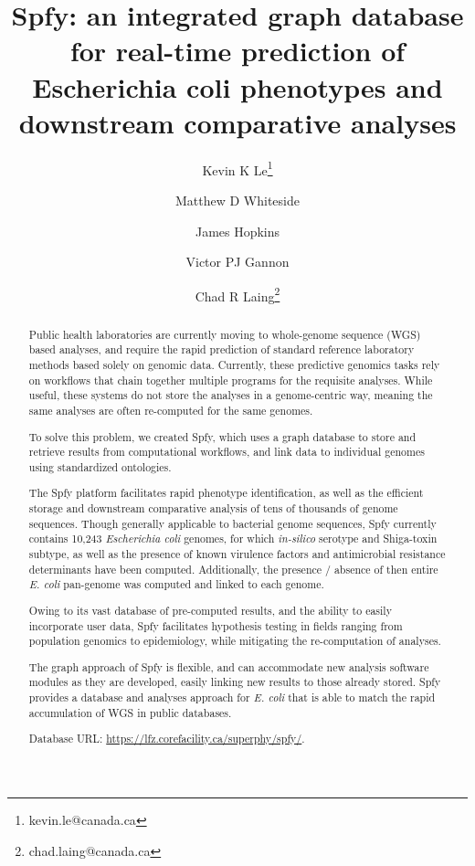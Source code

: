 \documentclass{article}
\begin{document}
\title{Spfy: an integrated graph database for real-time prediction of Escherichia coli phenotypes and downstream comparative analyses}

\author[1]{Kevin K Le\thanks{kevin.le@canada.ca}}
\author[1]{Matthew D Whiteside}
\author[1]{James Hopkins}
\author[1]{Victor PJ Gannon}
\author[1]{Chad R Laing\thanks{chad.laing@canada.ca}}

\renewcommand\Authands{ and }

\maketitle

\begin{abstract}

Public health laboratories are currently moving to whole-genome sequence (WGS) based analyses, and require the rapid prediction of standard reference laboratory methods based solely on genomic data. Currently, these predictive genomics tasks rely on workflows that chain together multiple programs for the requisite analyses. While useful, these systems do not store the analyses in a genome-centric way, meaning the same analyses are often re-computed for the same genomes.

To solve this problem, we created Spfy, which uses a graph database to store and retrieve results from computational workflows, and link data to individual genomes using standardized ontologies.

The Spfy platform facilitates rapid phenotype identification, as well as the efficient storage and downstream comparative analysis of tens of thousands of genome sequences. Though generally applicable to bacterial genome sequences, Spfy currently contains 10,243 \textit{Escherichia coli} genomes, for which \textit{in-silico} serotype and Shiga-toxin subtype, as well as the presence of known virulence factors and antimicrobial resistance determinants have been computed. Additionally, the presence / absence of then entire \textit{E. coli} pan-genome was computed and linked to each genome.

Owing to its vast database of pre-computed results, and the ability to easily incorporate user data, Spfy facilitates hypothesis testing in fields ranging from population genomics to epidemiology, while mitigating the re-computation of analyses.

The graph approach of Spfy is flexible, and can accommodate new analysis software modules as they are developed, easily linking new results to those already stored. Spfy provides a database and analyses approach for \textit{E. coli} that is able to match the rapid accumulation of WGS in public databases.
\par

Database URL: \url{https://lfz.corefacility.ca/superphy/spfy/}.

\end{abstract}
\end{document}

